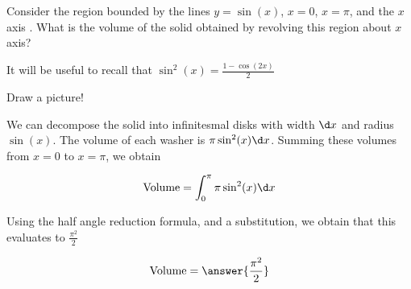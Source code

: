 \documentclass{ximera}
\author{Steven Gubkin}
\begin{document}
\begin{exercise}



Consider the region bounded by the lines $y = \sin(x)$, $x=0$, $x=\pi$, and the $x$ axis .  What is the volume of the solid obtained by revolving this region about $x$ axis?

It will be useful to recall that  $\sin^2(x) = \frac{1-\cos(2x)}{2}$

\begin{hint}
	Draw a picture!
\end{hint}

\begin{hint}
	We can decompose the solid into infinitesmal disks with width $\d x$ and radius $\sin(x)$. The volume of each washer is $\pi \sin^2(x)\d x$.  Summing these volumes from $x=0$ to $x=\pi$, we obtain

	\[
	\textrm{Volume} = \int_0^\pi \pi \sin^2(x)\d x
	\]
\end{hint}


\begin{hint}
	Using the half angle reduction formula, and a substitution, we obtain that this evaluates to $\frac{\pi^2}{2}$
\end{hint}

\begin{prompt}
	\[
		\textrm{Volume} = \answer{\frac{\pi^2}{2}}
	\]
\end{prompt}

\end{exercise}
\end{document}
